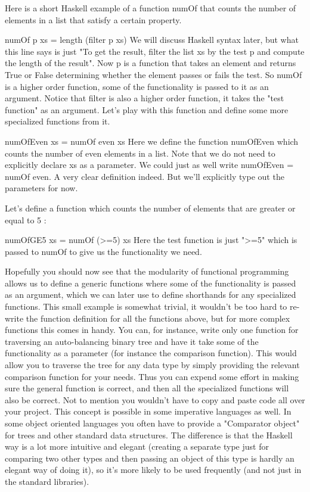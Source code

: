 \documentclass[main.tex]{subfiles}
\begin{document}
{{%

Here is a short Haskell example of a function numOf that counts the number of elements in a list that satisfy a certain property.

numOf p xs = length (filter p xs)
We will discuss Haskell syntax later, but what this line says is just "To get the result, filter the list xs by the test p and compute the length of the result". Now p is a function that takes an element and returns True or False determining whether the element passes or fails the test. So numOf is a higher order function, some of the functionality is passed to it as an argument. Notice that filter is also a higher order function, it takes the "test function" as an argument. Let's play with this function and define some more specialized functions from it.

numOfEven xs = numOf even xs
Here we define the function numOfEven which counts the number of even elements in a list. Note that we do not need to explicitly declare xs as a parameter. We could just as well write numOfEven = numOf even. A very clear definition indeed. But we'll explicitly type out the parameters for now.

Let's define a function which counts the number of elements that are greater or equal to 5 :

numOfGE5 xs = numOf (>=5) xs
Here the test function is just ">=5" which is passed to numOf to give us the functionality we need.

Hopefully you should now see that the modularity of functional programming allows us to define a generic functions where some of the functionality is passed as an argument, which we can later use to define shorthands for any specialized functions. This small example is somewhat trivial, it wouldn't be too hard to re-write the function definition for all the functions above, but for more complex functions this comes in handy. You can, for instance, write only one function for traversing an auto-balancing binary tree and have it take some of the functionality as a parameter (for instance the comparison function). This would allow you to traverse the tree for any data type by simply providing the relevant comparison function for your needs. Thus you can expend some effort in making sure the general function is correct, and then all the specialized functions will also be correct. Not to mention you wouldn't have to copy and paste code all over your project. This concept is possible in some imperative languages as well. In some object oriented languages you often have to provide a "Comparator object" for trees and other standard data structures. The difference is that the Haskell way is a lot more intuitive and elegant (creating a separate type just for comparing two other types and then passing an object of this type is hardly an elegant way of doing it), so it's more likely to be used frequently (and not just in the standard libraries).

}}
\end{document}
